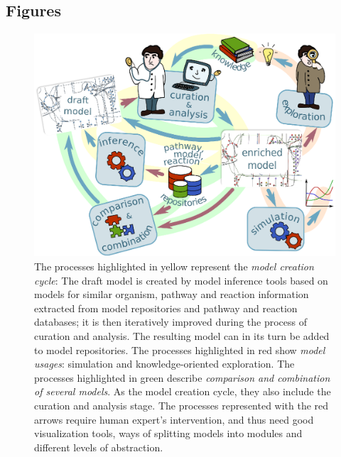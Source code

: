 \documentclass{bmcart}
\begin{document}
\begin{backmatter}


\section*{Figures}


\begin{figure}[h!]
\centering
\includegraphics[scale=1]{figure1.eps}
\caption{ 
\label{fig:workflow}
The processes highlighted in yellow represent the \emph{model creation cycle}: The draft model is created by model inference tools based on models for similar organism, pathway and reaction information extracted from model repositories and pathway and reaction databases; it is then iteratively improved during the process of curation and analysis. The resulting model can in its turn be added to model repositories.
The processes highlighted in red show \emph{model usages}: simulation and knowledge-oriented exploration.
The processes highlighted in green describe \emph{comparison and combination of several models}. As the model creation cycle, they also include the curation and analysis stage.
The processes represented with the red arrows require human expert's intervention, and thus need good visualization tools, ways of splitting models into modules and different levels of abstraction.}
\end{figure}
      

\end{backmatter}
\end{document}

